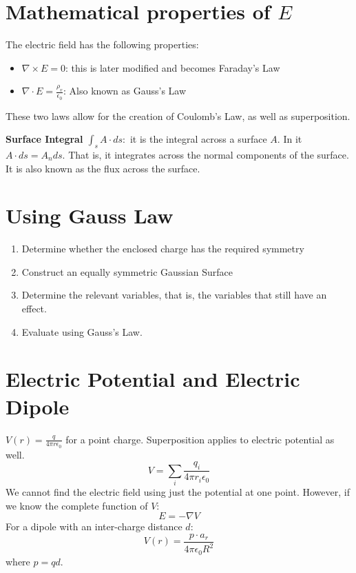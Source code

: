 \documentclass[nobib]{tufte-handout}
\newcommand{\defn}[2]{
        \begin{defbox}
        \noindent\textbf{#1}:\ #2
        \end{defbox}
}
\begin{document}
\section{Mathematical properties of $E$}
The electric field has the following properties:
\begin{itemize}
    \item $\nabla \times E = 0$: this is later modified and becomes Faraday's Law
    \item $\nabla \cdot E = \frac{\rho_v}{\epsilon_0}$: Also known as Gauss's Law
\end{itemize}
These two laws allow for the creation of Coulomb's Law, as well as superposition.
\defn{Surface Integral $\int_s A\cdot ds$}{it is the integral across a surface $A$. In it $A\cdot ds = A_n ds$. That is, it integrates across the normal components of the surface. It is also known as the flux across the surface.}
\section{Using Gauss Law}
\begin{enumerate}
    \item Determine whether the enclosed charge has the required symmetry
    \item Construct an equally symmetric Gaussian Surface
    \item Determine the relevant variables, that is, the variables that still have an effect.
    \item Evaluate using Gauss's Law.
\end{enumerate}
\section{Electric Potential and Electric Dipole}
$V(r) = \frac{q}{4\pi r \epsilon_0}$ for a point charge.
Superposition applies to electric potential as well.
\begin{equation*}
    V = \sum_{i}\frac{q_i}{4\pi r_i \epsilon_0}
\end{equation*}
We cannot find the electric field using just the potential at one point.
However, if we know the complete function of $V$:
\begin{equation*}
    E = -\nabla V
\end{equation*}
For a dipole with an inter-charge distance $d$:
\begin{equation*}
    V(r) = \frac{p \cdot a_r}{4\pi \epsilon_0 R^2}
\end{equation*}
where $p=qd$.
\end{document}
